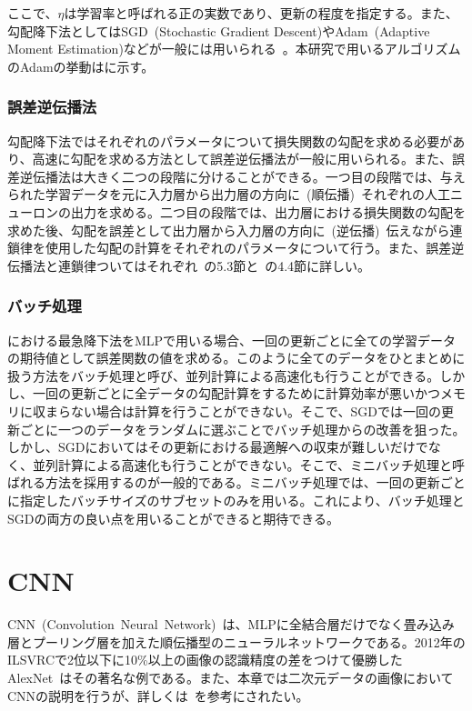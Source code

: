 ここで、$\eta$は学習率と呼ばれる正の実数であり、更新の程度を指定する。また、勾配降下法としてはSGD~(Stochastic Gradient Descent)やAdam~(Adaptive Moment Estimation)などが一般には用いられる~\cite{GradientDescent}。本研究で用いるアルゴリズムのAdamの挙動はに示す。

\subsubsection{誤差逆伝播法}

勾配降下法ではそれぞれのパラメータについて損失関数の勾配を求める必要があり、高速に勾配を求める方法として誤差逆伝播法が一般に用いられる。また、誤差逆伝播法は大きく二つの段階に分けることができる。一つ目の段階では、与えられた学習データを元に入力層から出力層の方向に~(順伝播)~それぞれの人工ニューロンの出力を求める。二つ目の段階では、出力層における損失関数の勾配を求めた後、勾配を誤差として出力層から入力層の方向に~(逆伝播)~伝えながら連鎖律を使用した勾配の計算をそれぞれのパラメータについて行う。また、誤差逆伝播法と連鎖律ついてはそれぞれ~\cite{Bishop}の5.3節と~\cite{Calculus}の4.4節に詳しい。

\subsubsection{バッチ処理}

における最急降下法をMLPで用いる場合、一回の更新ごとに全ての学習データの期待値として誤差関数の値を求める。このように全てのデータをひとまとめに扱う方法をバッチ処理と呼び、並列計算による高速化も行うことができる。しかし、一回の更新ごとに全データの勾配計算をするために計算効率が悪いかつメモリに収まらない場合は計算を行うことができない。そこで、SGDでは一回の更新ごとに一つのデータをランダムに選ぶことでバッチ処理からの改善を狙った。しかし、SGDにおいてはその更新における最適解への収束が難しいだけでなく、並列計算による高速化も行うことができない。そこで、ミニバッチ処理と呼ばれる方法を採用するのが一般的である。ミニバッチ処理では、一回の更新ごとに指定したバッチサイズのサブセットのみを用いる。これにより、バッチ処理とSGDの両方の良い点を用いることができると期待できる。

\clearpage

\section{CNN}

CNN~(Convolution~Neural~Network)~は、MLPに全結合層だけでなく畳み込み層とプーリング層を加えた順伝播型のニューラルネットワークである。2012年のILSVRCで2位以下に10\%以上の画像の認識精度の差をつけて優勝したAlexNet~\cite{AlexNet}はその著名な例である。また、本章では二次元データの画像においてCNNの説明を行うが、詳しくは~\cite{CNN_recent}を参考にされたい。

